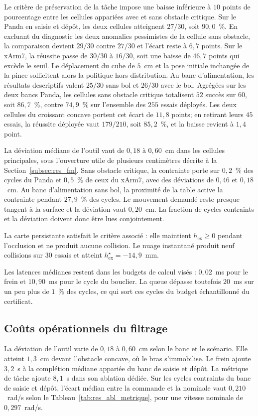 Le critère de préservation de la tâche impose une baisse inférieure à $10$ points de pourcentage entre les cellules appariées avec et sans obstacle critique. Sur le Panda en saisie et dépôt, les deux cellules atteignent $27/30$, soit $90{,}0$~\%. En excluant du diagnostic les deux anomalies pessimistes de la cellule sans obstacle, la comparaison devient $29/30$ contre $27/30$ et l'écart reste à $6{,}7$ points. Sur le xArm7, la réussite passe de $30/30$ à $16/30$, soit une baisse de $46{,}7$ points qui excède le seuil. Le déplacement du cube de $5$~cm et la pose initiale inchangée de la pince sollicitent alors la politique hors distribution. Au banc d'alimentation, les résultats descriptifs valent $25/30$ sans bol et $26/30$ avec le bol. Agrégées sur les deux bancs Panda, les cellules sans obstacle critique totalisent $52$ succès sur $60$, soit $86{,}7$~\%, contre $74{,}9$~\% sur l'ensemble des $255$ essais déployés. Les deux cellules du croissant concave portent cet écart de $11{,}8$ points; en retirant leurs $45$ essais, la réussite déployée vaut $179/210$, soit $85{,}2$~\%, et la baisse revient à $1{,}4$ point.

La déviation médiane de l'outil vaut de $0{,}18$ à $0{,}60$~cm dans les cellules principales, sous l'ouverture utile de plusieurs centimètres décrite à la Section~\ref{subsec:res_fm}. Sans obstacle critique, la contrainte porte sur $0{,}2$~\% des cycles du Panda et $0{,}5$~\% de ceux du xArm7, avec des déviations de $0{,}46$ et $0{,}18$~cm. Au banc d'alimentation sans bol, la proximité de la table active la contrainte pendant $27{,}9$~\% des cycles. Le mouvement demandé reste presque tangent à la surface et la déviation vaut $0{,}20$~cm. La fraction de cycles contraints et la déviation doivent donc être lues conjointement.

La carte persistante satisfait le critère associé : elle maintient $h_{\mathrm{ex}}\geq0$ pendant l'occlusion et ne produit aucune collision. Le nuage instantané produit neuf collisions sur $30$ essais et atteint $h_{\mathrm{ex}}^{\star}=-14{,}9$~mm.

Les latences médianes restent dans les budgets de calcul visés : $0{,}02$~ms pour le frein et $10{,}90$~ms pour le cycle du bouclier. La queue dépasse toutefois $20$~ms sur un peu plus de $1$~\% des cycles, ce qui sort ces cycles du budget échantillonné du certificat.

\subsection*{Coûts opérationnels du filtrage}
La déviation de l'outil varie de $0{,}18$ à $0{,}60$~cm selon le banc et le scénario. Elle atteint $1{,}3$~cm devant l'obstacle concave, où le bras s'immobilise. Le frein ajoute $3{,}2$~s à la complétion médiane appariée du banc de saisie et dépôt. La métrique de tâche ajoute $8{,}1$~s dans son ablation dédiée. Sur les cycles contraints du banc de saisie et dépôt, l'écart médian entre la commande et la nominale vaut $0{,}210$~rad/s selon le Tableau~\ref{tab:res_abl_metrique}, pour une vitesse nominale de $0{,}297$~rad/s.

